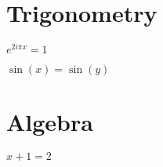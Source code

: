 \documentclass[10pt,a4paper]{article}
\begin{document}
\section{Trigonometry}

$e^{2i \pi x} = 1$

$\sin(x)=\sin(y)$

\section{Algebra}

$x+1=2$
\end{document}
